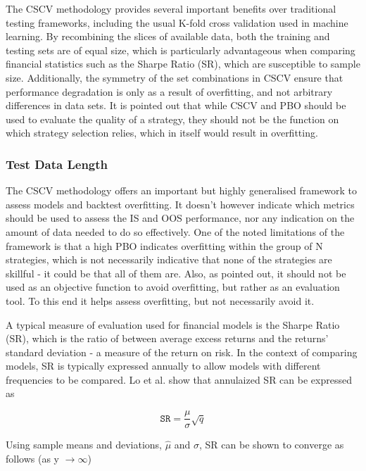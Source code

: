 \documentclass[a4paper,11pt,oneside]{article}
\theoremstyle{plain}
\theoremstyle{definition}
\begin{document}
The CSCV methodology provides several important benefits over traditional testing 
frameworks, including the usual K-fold cross validation used in machine learning. By recombining the slices of 
available data, both the training and testing sets are of equal size, which is particularly advantageous when comparing 
financial statistics such as the Sharpe Ratio (SR), which are susceptible to sample size. Additionally, the symmetry 
of the set combinations in CSCV ensure that performance degradation is only as a result of overfitting, and not 
arbitrary differences in data sets. It is pointed out that while CSCV and PBO should be used to evaluate the quality 
of a strategy, they should not be the function on which strategy selection relies, which in itself would result in overfitting.
\hfill \break 

\subsubsection{Test Data Length}

The CSCV methodology offers an important but highly generalised framework to assess models and backtest 
overfitting. It doesn’t however indicate which metrics should be used to assess the IS and OOS performance, nor 
any indication on the amount of data needed to do so effectively. One of the noted limitations of the framework is 
that a high PBO indicates overfitting within the group of N strategies, which is not necessarily indicative that none 
of the strategies are skillful - it could be that all of them are. Also, as pointed out, it should not be used as an 
objective function to avoid overfitting, but rather as an evaluation tool. To this end it helps assess overfitting, but 
not necessarily avoid it. 
\hfill \break 

A typical measure of evaluation used for financial models is the Sharpe Ratio (SR), which is the ratio of between 
average excess returns and the returns’ standard deviation - a measure of the return on risk. In the context of 
comparing models, SR is typically expressed annually to allow models with different frequencies to be compared. 
Lo et al. \cite{Lo} show that annulaized SR can be expressed as

\begin{equation}\label{SRAnnual}
\texttt{SR}=\frac{\mu}{\sigma}\sqrt{q}
\end{equation}

Using sample means and deviations, $\hat{\mu}$ and $\hat{\sigma}$, SR can be shown to converge as follows 
(as y $\rightarrow\infty$)
\end{document}
